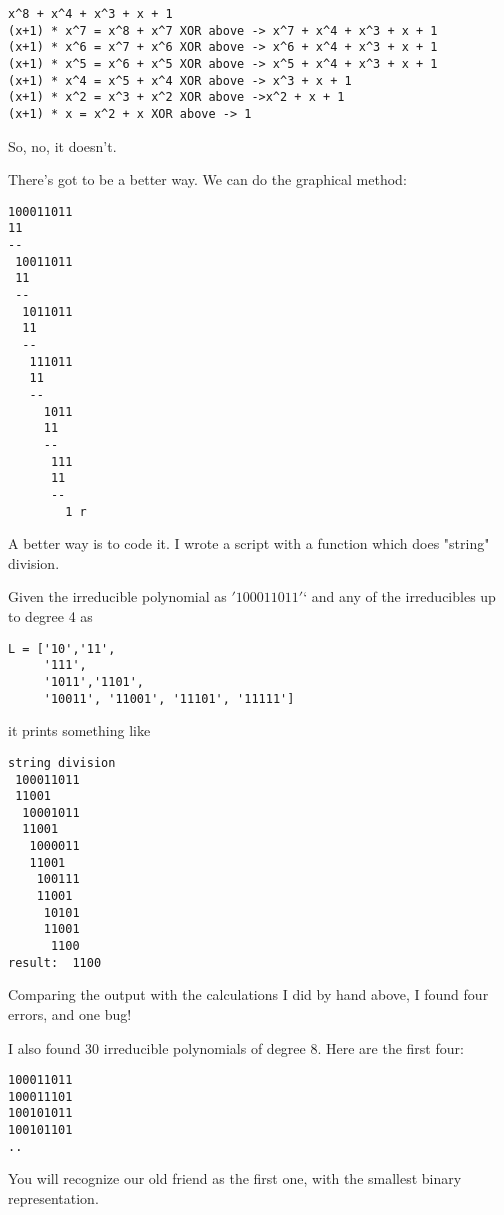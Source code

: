 \documentclass[11pt, oneside]{article}
\begin{document}
\begin{verbatim}
x^8 + x^4 + x^3 + x + 1
(x+1) * x^7 = x^8 + x^7 XOR above -> x^7 + x^4 + x^3 + x + 1
(x+1) * x^6 = x^7 + x^6 XOR above -> x^6 + x^4 + x^3 + x + 1
(x+1) * x^5 = x^6 + x^5 XOR above -> x^5 + x^4 + x^3 + x + 1
(x+1) * x^4 = x^5 + x^4 XOR above -> x^3 + x + 1
(x+1) * x^2 = x^3 + x^2 XOR above ->x^2 + x + 1
(x+1) * x = x^2 + x XOR above -> 1
\end{verbatim}

So, no, it doesn't.

There's got to be a better way.  We can do the graphical method:

\begin{verbatim}
100011011
11
--
 10011011
 11
 --
  1011011
  11
  --
   111011
   11
   --
     1011
     11
     -- 
      111
      11
      --
        1 r
\end{verbatim}

A better way is to code it.  I wrote a script with a function which does "string" division.  

Given the irreducible polynomial as $'100011011'$` and any of the irreducibles up to degree 4 as

\begin{verbatim}
L = ['10','11',
     '111',
     '1011','1101',
     '10011', '11001', '11101', '11111']

\end{verbatim}

it prints something like

\begin{verbatim}
string division
 100011011
 11001
  10001011
  11001
   1000011
   11001
    100111
    11001
     10101
     11001
      1100
result:  1100
\end{verbatim}

Comparing the output with the calculations I did by hand above, I found four errors, and one bug!

I also found 30 irreducible polynomials of degree 8.  Here are the first four:

\begin{verbatim}
100011011
100011101
100101011
100101101
..
\end{verbatim}

You will recognize our old friend as the first one, with the smallest binary representation.
\end{document}
